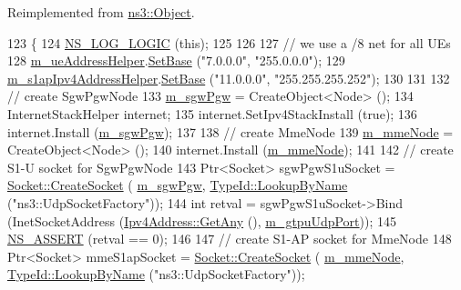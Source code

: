 Reimplemented from \hyperlink{classns3_1_1Object_af8482a521433409fb5c7f749398c9dbe}{ns3\+::\+Object}.


\begin{DoxyCode}
123 \{
124   \hyperlink{group__logging_ga88acd260151caf2db9c0fc84997f45ce}{NS\_LOG\_LOGIC} (\textcolor{keyword}{this});   
125 
126 
127   \textcolor{comment}{// we use a /8 net for all UEs}
128   \hyperlink{classns3_1_1EmuEpcHelper_ab57fc887c64c3f3aec6516957a84275d}{m\_ueAddressHelper}.\hyperlink{classns3_1_1Ipv4AddressHelper_acf7b16dd25bac67e00f5e25f90a9a035}{SetBase} (\textcolor{stringliteral}{"7.0.0.0"}, \textcolor{stringliteral}{"255.0.0.0"});
129   \hyperlink{classns3_1_1EmuEpcHelper_af71f1e0e4c76588bf8c7565484614c08}{m\_s1apIpv4AddressHelper}.\hyperlink{classns3_1_1Ipv4AddressHelper_acf7b16dd25bac67e00f5e25f90a9a035}{SetBase} (\textcolor{stringliteral}{"11.0.0.0"}, \textcolor{stringliteral}{"255.255.255.252"});
130   
131  
132   \textcolor{comment}{// create SgwPgwNode}
133   \hyperlink{classns3_1_1EmuEpcHelper_a5c68f673b82b8c80b5fb88ae986f8cea}{m\_sgwPgw} = CreateObject<Node> ();
134   InternetStackHelper internet;
135   internet.SetIpv4StackInstall (\textcolor{keyword}{true});
136   internet.Install (\hyperlink{classns3_1_1EmuEpcHelper_a5c68f673b82b8c80b5fb88ae986f8cea}{m\_sgwPgw});
137 
138   \textcolor{comment}{// create MmeNode}
139   \hyperlink{classns3_1_1EmuEpcHelper_aef136870f0ad1c40d3e139f34ff9f5d1}{m\_mmeNode} = CreateObject<Node> ();
140   internet.Install (\hyperlink{classns3_1_1EmuEpcHelper_aef136870f0ad1c40d3e139f34ff9f5d1}{m\_mmeNode});
141   
142   \textcolor{comment}{// create S1-U socket for SgwPgwNode}
143   Ptr<Socket> sgwPgwS1uSocket = \hyperlink{classns3_1_1Socket_ad448a62bb50ad3dbac59c879a885a8d2}{Socket::CreateSocket} (
      \hyperlink{classns3_1_1EmuEpcHelper_a5c68f673b82b8c80b5fb88ae986f8cea}{m\_sgwPgw}, \hyperlink{classns3_1_1TypeId_a119cf99c20931fdc294602cd360b180e}{TypeId::LookupByName} (\textcolor{stringliteral}{"ns3::UdpSocketFactory"}));
144   \textcolor{keywordtype}{int} retval = sgwPgwS1uSocket->Bind (InetSocketAddress (\hyperlink{classns3_1_1Ipv4Address_a7a39b330c8e701183a411d5779fca1a4}{Ipv4Address::GetAny} (), 
      \hyperlink{classns3_1_1EmuEpcHelper_a99fe0fcbc0bd3668f30cf6ae53377a22}{m\_gtpuUdpPort}));
145   \hyperlink{assert_8h_a6dccdb0de9b252f60088ce281c49d052}{NS\_ASSERT} (retval == 0);
146 
147   \textcolor{comment}{// create S1-AP socket for MmeNode}
148   Ptr<Socket> mmeS1apSocket = \hyperlink{classns3_1_1Socket_ad448a62bb50ad3dbac59c879a885a8d2}{Socket::CreateSocket} (
      \hyperlink{classns3_1_1EmuEpcHelper_aef136870f0ad1c40d3e139f34ff9f5d1}{m\_mmeNode}, \hyperlink{classns3_1_1TypeId_a119cf99c20931fdc294602cd360b180e}{TypeId::LookupByName} (\textcolor{stringliteral}{"ns3::UdpSocketFactory"}));

\end{DoxyCode}
